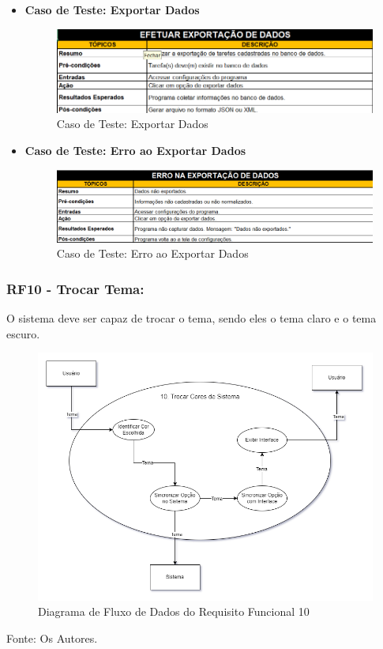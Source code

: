 \documentclass[a4paper,12pt]{article}
\begin{document}
\begin{itemize}
	\item\textbf{Caso de Teste: Exportar Dados}
	\begin{figure}
		\centering
		\includegraphics[scale=0.65]{UnitTest/trueCase/exportData.png}
		\caption{Caso de Teste: Exportar Dados}
	\end{figure}
	\item\textbf{Caso de Teste: Erro ao Exportar Dados}
	\begin{figure}
		\centering
		\includegraphics[scale=0.65]{UnitTest/falseCase/exportData.png}
		\caption{Caso de Teste: Erro ao Exportar Dados}
	\end{figure}
\end{itemize}

\pagebreak
\subsubsection{RF10 - Trocar Tema:}
O sistema deve ser capaz de trocar o tema, sendo eles o tema claro e o tema escuro.
\begin{figure}[H]
	\centering
	\includegraphics[scale=0.45]{DFDs/RF10.drawio.png}
	\caption{Diagrama de Fluxo de Dados do Requisito Funcional 10}
\end{figure}
\noindent Fonte: Os Autores.
\end{document}
